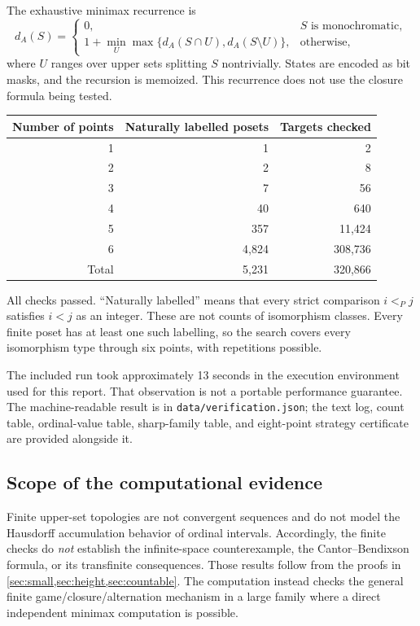 \documentclass[11pt,letterpaper]{article}
\numberwithin{equation}{section}
\theoremstyle{definition}
\theoremstyle{remark}
\theoremstyle{definition}
\begin{document}
The exhaustive minimax recurrence is
\[
 d_A(S)=
 \begin{cases}
 0,&S\text{ is monochromatic},\\
 1+\displaystyle\min_U\max\{d_A(S\cap U),d_A(S\setminus U)\},&\text{otherwise},
 \end{cases}
\]
where $U$ ranges over upper sets splitting $S$ nontrivially. States are encoded
as bit masks, and the recursion is memoized. This recurrence does not use the
closure formula being tested.

\begin{center}
\begin{tabular}{@{}rrr@{}}
\toprule
Number of points & Naturally labelled posets & Targets checked\\
\midrule
1 & 1 & 2\\
2 & 2 & 8\\
3 & 7 & 56\\
4 & 40 & 640\\
5 & 357 & 11,424\\
6 & 4,824 & 308,736\\
\midrule
Total & 5,231 & 320,866\\
\bottomrule
\end{tabular}
\end{center}

All checks passed. ``Naturally labelled'' means that every strict comparison
$i<_{P}j$ satisfies $i<j$ as an integer. These are not counts of isomorphism
classes. Every finite poset has at least one such labelling, so the search
covers every isomorphism type through six points, with repetitions possible.

The included run took approximately 13 seconds in the execution environment
used for this report. That observation is not a portable performance guarantee.
The machine-readable result is in \texttt{data/verification.json}; the text log,
count table, ordinal-value table, sharp-family table, and eight-point strategy
certificate are provided alongside it.

\subsection{Scope of the computational evidence}

Finite upper-set topologies are not convergent sequences and do not model the
Hausdorff accumulation behavior of ordinal intervals. Accordingly, the finite
checks do \emph{not} establish the infinite-space counterexample, the
Cantor--Bendixson formula, or its transfinite consequences. Those results follow
from the proofs in \cref{sec:small,sec:height,sec:countable}. The computation
instead checks the general finite game/closure/alternation mechanism in a
large family where a direct independent minimax computation is possible.
\end{document}

